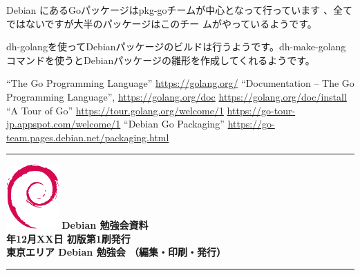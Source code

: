 \documentclass[mingoth,a4paper]{jsarticle}
\newcommand{\debmtgyear}{2020}
\newcommand{\debmtgmonth}{12}
\newcommand{\debmtgdate}{XX}
\begin{document}
Debian にあるGoパッケージはpkg-goチームが中心となって行っています
\cite{debian-go-packaging}、全てではないですが大半のパッケージはこのチー
ムがやっているようです。

dh-golangを使ってDebianパッケージのビルドは行うようです。dh-make-golang
コマンドを使うとDebianパッケージの雛形を作成してくれるようです。

\begin{thebibliography}{1}
  ``The Go Programming Language'' \url{https://golang.org/}
  ``Documentation -- The Go Programming Language'', \url{https://golang.org/doc}
  \url{https://golang.org/doc/install}
  ``A Tour of Go'' \url{https://tour.golang.org/welcome/1}
  \url{https://go-tour-jp.appspot.com/welcome/1}
  ``Debian Go Packaging'' \url{https://go-team.pages.debian.net/packaging.html}
\end{thebibliography}



\mbox{}\newpage
\mbox{}\newpage

\vspace*{15cm}
\hrule
\vspace{2mm}
\includegraphics[width=2cm]{image-assets/openlogo-nd.eps}
\noindent \Large \bf Debian 勉強会資料\\
\noindent \normalfont \debmtgyear{}年\debmtgmonth{}月\debmtgdate{}日 \hspace{5mm}  初版第1刷発行\\
\noindent \normalfont 東京エリア Debian 勉強会 （編集・印刷・発行）\\
\hrule
\end{document}
